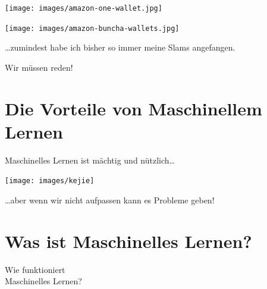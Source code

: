 \documentclass[aspectratio=169,x11names]{beamer}
\begin{document}
\begin{frame}
\begin{center}
\texttt{[image: images/amazon-one-wallet.jpg]} 
\end{center}
\end{frame}

\begin{frame}
\begin{center}
\texttt{[image: images/amazon-buncha-wallets.jpg]} 
\end{center}
\end{frame}


\begin{frame}

\begin{center}
\dots zumindest habe ich bisher so immer meine Slams angefangen.
\bigskip

Wir müssen reden!
\end{center}

\end{frame}

\section{Die Vorteile von Maschinellem Lernen}

\begin{frame}

\begin{center}
Maschinelles Lernen ist mächtig und nützlich\dots
\end{center}

\begin{center}
\texttt{[image: images/kejie]} 
\end{center}

\begin{center}
\dots aber wenn wir nicht aufpassen kann es Probleme geben!
\end{center}
\end{frame}


\section{Was ist Maschinelles Lernen?}

\begin{frame}
\begin{center}
\huge
Wie funktioniert\\Maschinelles Lernen?
\end{center}
\end{frame}
\end{document}
